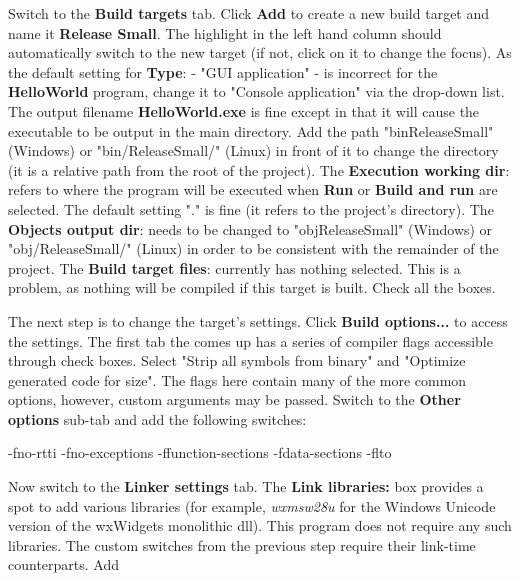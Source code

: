 
Switch to the \textbf{Build targets} tab. Click \textbf{Add} to create a new build target and name it \textbf{Release Small}. The highlight in the left hand column should automatically switch to the new target (if not, click on it to change the focus). As the default setting for \textbf{Type}: - "GUI application" - is incorrect for the \textbf{HelloWorld} program, change it to "Console application" via the drop-down list. The output filename \textbf{HelloWorld.exe} is fine except in that it will cause the executable to be output in the main directory. Add the path "bin\osp ReleaseSmall\osp " (Windows) or "bin/ReleaseSmall/" (Linux) in front of it to change the directory (it is a relative path from the root of the project). The \textbf{Execution working dir}: refers to where the program will be executed when \textbf{Run} or \textbf{Build and run} are selected. The default setting "." is fine (it refers to the project's directory). The \textbf{Objects output dir}: needs to be changed to "obj\osp ReleaseSmall\osp" (Windows) or "obj/ReleaseSmall/" (Linux) in order to be consistent with the remainder of the project. The \textbf{Build target files}: currently has nothing selected. This is a problem, as nothing will be compiled if this target is built. Check all the boxes. 


The next step is to change the target's settings. Click \textbf{Build options...} to access the settings. The first tab the comes up has a series of compiler flags accessible through check boxes. Select "Strip all symbols from binary" and "Optimize generated code for size". The flags here contain many of the more common options, however, custom arguments may be passed. Switch to the \textbf{Other options} sub-tab and add the following switches:

\begin{code}
-fno-rtti
-fno-exceptions
-ffunction-sections
-fdata-sections
-flto
\end{code}

Now switch to the \textbf{Linker settings} tab. The \textbf{Link libraries:} box provides a spot to add various libraries (for example, \textit{wxmsw28u} for the Windows Unicode version of the wxWidgets monolithic dll). This program does not require any such libraries. The custom switches from the previous step require their link-time counterparts. Add

